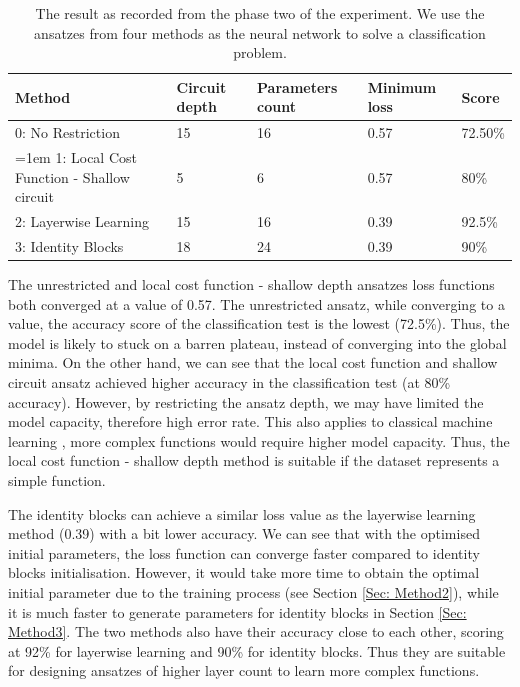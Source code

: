 \begin{table}
    \centering
    \begin{tabular}{|| p{4cm} p{2cm} p{2cm} p{2cm} p{2cm} ||}
        \hline
        \textbf{Method}                          & \textbf{Circuit depth} & \textbf{Parameters count} & \textbf{Minimum loss} & \textbf{Score} \\
        \hline \hline
        0: No Restriction                        & 15                     & 16                        & 0.57                  & 72.50\%        \\
        \raggedright
        \hangindent=1em
        \hangafter=1
        1: Local Cost Function - Shallow circuit & 5                      & 6                         & 0.57                  & 80\%           \\
        2: Layerwise Learning                    & 15                     & 16                        & 0.39                  & 92.5\%         \\
        3: Identity Blocks                       & 18                     & 24                        & 0.39                  & 90\%           \\
        \hline
    \end{tabular}
    \caption{
        The result as recorded from the phase two of the experiment.
        We use the ansatzes from four methods as the neural network to solve a classification problem.
    }
    \label{Tab: Experiment Phase 2 Res}
\end{table}

The unrestricted and local cost function - shallow depth ansatzes loss functions both converged at a value of 0.57.
The unrestricted ansatz, while converging to a value, the accuracy score of the classification test is the lowest (72.5\%).
Thus, the model is likely to stuck on a barren plateau, instead of converging into the global minima.
On the other hand, we can see that the local cost function and shallow circuit ansatz achieved higher accuracy in the classification test (at 80\% accuracy).
However, by restricting the ansatz depth, we may have limited the model capacity, therefore high error rate.
This also applies to classical machine learning \cite{ianDeepLearningAdaptive2016}, more complex functions would require higher model capacity. 
Thus, the local cost function - shallow depth method is suitable if the dataset represents a simple function.


The identity blocks can achieve a similar loss value as the layerwise learning method (0.39) with a bit lower accuracy.
We can see that with the optimised initial parameters, the loss function can converge faster compared to identity blocks initialisation.
However, it would take more time to obtain the optimal initial parameter due to the training process (see Section \ref{Sec: Method2}), while it is much faster to generate parameters for identity blocks in Section \ref{Sec: Method3}.
The two methods also have their accuracy close to each other, scoring at 92\% for layerwise learning and 90\% for identity blocks.
Thus they are suitable for designing ansatzes of higher layer count to learn more complex functions.


